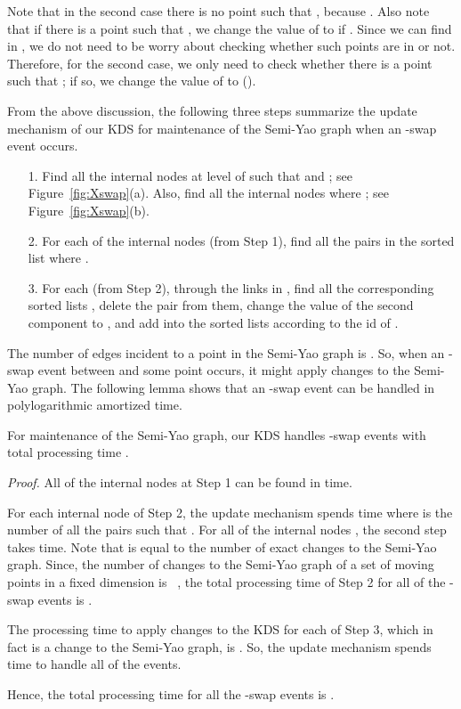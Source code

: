 \documentclass[11pt]{llncs}
\renewenvironment{proof}{\emph{Proof.}}{\hfill  \medskip\\}
\begin{document}
Note that in the second case there is no point  such that , because . Also note that if there is a point  such that , we change the value of  to  if . Since we can find  in , we do not need to be worry about checking whether such points  are in  or not. Therefore, for the second case, we only need to check whether there is a point  such that ; if so, we change the value of  to  ().

From the above discussion, the following three steps summarize the update mechanism of our KDS for maintenance of the Semi-Yao graph when an -swap event occurs.
\begin{itemize}
\item[1.] Find all the internal nodes  at level  of  such that  and ; see Figure~\ref{fig:Xswap}(a). Also, find all the internal nodes  where ; see Figure~\ref{fig:Xswap}(b).
\item[2.] For each of the internal nodes  (from Step 1), find all the pairs  in the sorted list  where .
\item[3.] For each  (from Step 2), through the links in , find all the corresponding sorted lists , delete the pair  from them, change the value of the second component  to , and add  into the sorted lists according to the id of .
\end{itemize}
The number of edges incident to a point  in the Semi-Yao graph is . So, when an -swap event between  and some point  occurs, it might apply  changes to the Semi-Yao graph. The following lemma shows that an -swap event can be handled in polylogarithmic amortized time.
\begin{lemma}\label{the:Xswap}
For maintenance of the Semi-Yao graph, our KDS handles  -swap events with total processing time .
\end{lemma}
\begin{proof} 
All of the internal nodes  at Step 1 can be found in  time. 

For each internal node  of Step 2, the update mechanism spends  time where  is the number of all the pairs  such that . For all of the internal nodes , the second step takes  time. Note that  is equal to the number of exact changes to the Semi-Yao graph. Since, the number of changes to the Semi-Yao graph of a set of  moving points in a fixed dimension  is ~\cite{socg17-rahmati}, the total processing time of Step 2 for all of the  -swap events is . 

The processing time to apply changes to the KDS for each  of Step 3, which in fact is a change to the Semi-Yao graph, is . So, the update mechanism spends  time to handle all of the  events.

Hence, the total processing time for all the -swap events is .
\end{proof}
\end{document}
